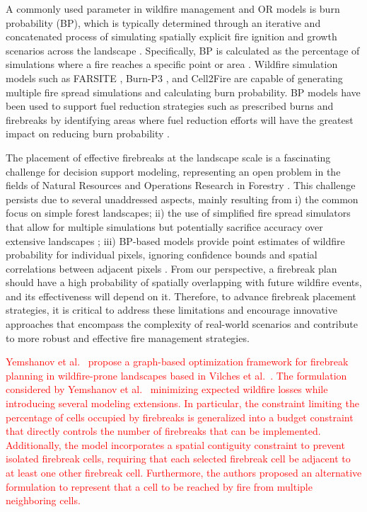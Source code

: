 \documentclass[a4paper,fleqn]{cas-sc}
\begin{document}
A commonly used parameter in wildfire management and OR models is burn probability (BP), which is typically determined through an iterative and concatenated process of simulating spatially explicit fire ignition and growth scenarios across the landscape \citep{parisien2005mapping,finney2005challenge}. Specifically, BP is calculated as the percentage of simulations where a fire reaches a specific point or area \citep{parisien2005mapping}. Wildfire simulation models such as FARSITE \citep{finney1998farsite}, Burn-P3 \citep{parisien2005mapping}, and Cell2Fire \citep{pais2021cell2fire} are capable of generating multiple fire spread simulations and calculating burn probability. BP models have been used to support fuel reduction strategies such as prescribed burns and firebreaks by identifying areas where fuel reduction efforts will have the greatest impact on reducing burn probability \citep{carrasco2023firebreak,ager2010comparison,oliveira2016assessing}.

The placement of effective firebreaks at the landscape scale is a fascinating challenge for decision support modeling, representing an open problem in the fields of Natural Resources and Operations Research in Forestry \citep{martell2007forest,ronnqvist2015operations}. This challenge persists due to several unaddressed aspects, mainly resulting from i) the common focus on simple forest landscapes; ii) the use of simplified fire spread simulators that allow for multiple simulations but potentially sacrifice accuracy over extensive landscapes \citep{bettinger2009,kim2009spatial,konoshima2008spatial,gonzalez2011integrating}; iii) BP-based models provide point estimates of wildfire probability for individual pixels, ignoring confidence bounds and spatial correlations between adjacent pixels \citep{kuhlmann2015generating}. From our perspective, a firebreak plan should have a high probability of spatially overlapping with future wildfire events, and its effectiveness will depend on it. Therefore, to advance firebreak placement strategies, it is critical to address these limitations and encourage innovative approaches that encompass the complexity of real-world scenarios and contribute to more robust and effective fire management strategies. 

\textcolor{red}{Yemshanov et al.~\citep{yemshanov2025graph} propose a graph-based optimization framework for firebreak planning in wildfire-prone landscapes based in Vilches et al.~\citep{vilches2023two}. The formulation considered by Yemshanov et al.~\citep{yemshanov2025graph}  minimizing expected wildfire losses while introducing several modeling extensions. In particular, the constraint limiting the percentage of cells occupied by firebreaks is generalized into a budget constraint that directly controls the number of firebreaks that can be implemented. Additionally, the model incorporates a spatial contiguity constraint to prevent isolated firebreak cells, requiring that each selected firebreak cell be adjacent to at least one other firebreak cell. Furthermore, the authors proposed an alternative formulation to represent that a cell to be reached by fire from multiple neighboring cells.}
\end{document}
